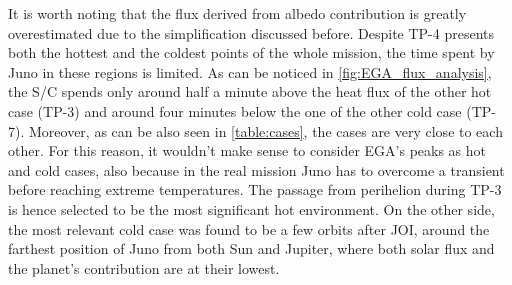 \vspace*{4mm}

It is worth noting that the flux derived from albedo contribution is greatly overestimated due to the simplification discussed before.
Despite TP-4 presents both the hottest and the coldest points of the whole mission, the time spent by Juno in these regions is limited.
As can be noticed in \autoref{fig:EGA_flux_analysis}, the S/C spends only around half a minute above the heat flux of the other hot case (TP-3) and around four minutes below the one of the other cold case (TP-7).
Moreover, as can be also seen in \autoref{table:cases}, the cases are very close to each other.
For this reason, it wouldn't make sense to consider EGA's peaks as hot and cold cases, also because in the real mission Juno has to overcome a transient before reaching extreme temperatures.
The passage from perihelion during TP-3 is hence selected to be the most significant hot environment.
On the other side, the most relevant cold case was found to be a few orbits after JOI, around the farthest position of Juno from both Sun and Jupiter, where both solar flux and the planet's contribution are at their lowest.